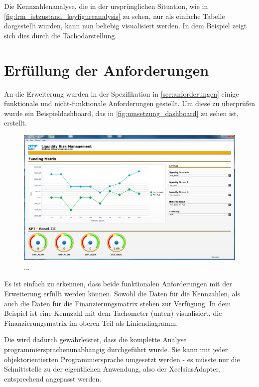 \begin{onehalfspacing}
Die Kennzahlenanalyse, die in der ursprünglichen Situation, wie in \vref{fig:lrm_istzustand_keyfigureanalysis} zu sehen, nur als einfache Tabelle dargestellt wurden, kann nun beliebig visualisiert werden. In dem Beispiel zeigt sich dies durch die Tachodarstellung.


\section{Erfüllung der Anforderungen}
An die Erweiterung wurden in der Spezifikation in \vref{sec:anforderungen} einige funktionale und nicht-funktionale Anforderungen gestellt. Um diese zu überprüfen wurde ein Beispieldashboard, das in \vref{fig:umsetzung_dashboard} zu sehen ist, erstellt.

\begin{figure}[h]
\centering
\setlength{\unitlength}{1mm}
\includegraphics[width=15cm]{images/dashboard_preview.PNG}
\caption{...\label{fig:umsetzung_dashboard}}
\end{figure}  

Es ist einfach zu erkennen, dass beide funktionalen Anforderungen mit der Erweiterung erfüllt werden können. Sowohl die Daten für die Kennzahlen, als auch die Daten für die Finanzierungsmatrix stehen zur Verfügung. In dem Beispiel ist eine Kennzahl mit dem Tachometer (unten) visualisiert, die Finanzierungsmatrix im oberen Teil als Liniendiagramm.

Die  wird dadurch gewährleistet, dass die komplette Analyse programmiersprachenunabhängig durchgeführt wurde. Sie kann mit jeder objektorientierten Programmiersprache umgesetzt werden - es müsste nur die Schnittstelle zu der eigentlichen Anwendung, also der XcelsiusAdapter, entsprechend angepasst werden.



\end{onehalfspacing}
